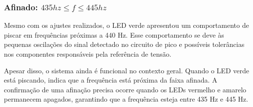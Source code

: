 \documentclass[a4paper, 12pt]{article}
\begin{document}
\subsubsection{Afinado: $435hz \leq f \leq 445hz$}

Mesmo com os ajustes realizados, o LED verde apresentou um comportamento de piscar em frequências próximas a 440 Hz. Esse comportamento se deve às pequenas oscilações do sinal detectado no circuito de pico e possíveis tolerâncias nos componentes responsáveis pela referência de tensão.

Apesar disso, o sistema ainda é funcional no contexto geral. Quando o LED verde está piscando, indica que a frequência está próxima da faixa afinada. A confirmação de uma afinação precisa ocorre quando os LEDs vermelho e amarelo permanecem apagados, garantindo que a frequência esteja entre 435 Hz e 445 Hz.
\end{document}
